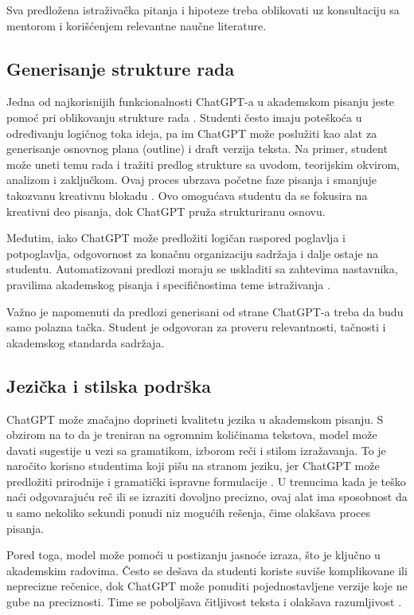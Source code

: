\documentclass[12pt]{article}
\begin{document}
Sva predložena istraživačka pitanja i hipoteze treba oblikovati uz konsultaciju sa mentorom i korišćenjem relevantne naučne literature. 

\subsection{Generisanje strukture rada}
Jedna od najkorisnijih funkcionalnosti ChatGPT-a u akademskom pisanju jeste pomoć pri oblikovanju strukture rada \cite{baig2024systematic}. Studenti često imaju poteškoća u određivanju logičnog toka ideja, pa im ChatGPT može poslužiti kao alat za generisanje osnovnog plana (outline) i draft verzija teksta. Na primer, student može uneti temu rada i tražiti predlog strukture sa uvodom, teorijskim okvirom, analizom i zaključkom. Ovaj proces ubrzava početne faze pisanja i smanjuje takozvanu kreativnu blokadu \cite{gradstudents2024revision}. Ovo omogućava studentu da se fokusira na kreativni deo pisanja, dok ChatGPT pruža strukturiranu osnovu.

Međutim, iako ChatGPT može predložiti logičan raspored poglavlja i potpoglavlja, odgovornost za konačnu organizaciju sadržaja i dalje ostaje na studentu. Automatizovani predlozi moraju se uskladiti sa zahtevima nastavnika, pravilima akademskog pisanja i specifičnostima teme istraživanja \cite{zakova2025exploring}. 

Važno je napomenuti da predlozi generisani od strane ChatGPT-a treba da budu samo polazna tačka. Student je odgovoran za proveru relevantnosti, tačnosti i akademskog standarda sadržaja.

\subsection{Jezička i stilska podrška}
ChatGPT može značajno doprineti kvalitetu jezika u akademskom pisanju. S obzirom na to da je treniran na ogromnim količinama tekstova, model može davati sugestije u vezi sa gramatikom, izborom reči i stilom izražavanja. To je naročito korisno studentima koji pišu na stranom jeziku, jer ChatGPT može predložiti prirodnije i gramatički ispravne formulacije \cite{alsaedi2024chatgpt}. U trenucima kada je teško naći odgovarajuću reč ili se izraziti dovoljno precizno, ovaj alat ima sposobnost da u samo nekoliko sekundi ponudi niz mogućih rešenja, čime olakšava proces pisanja.

Pored toga, model može pomoći u postizanju jasnoće izraza, što je ključno u akademskim radovima. Često se dešava da studenti koriste suviše komplikovane ili neprecizne rečenice, dok ChatGPT može ponuditi pojednostavljene verzije koje ne gube na preciznosti. Time se poboljšava čitljivost teksta i olakšava razumljivost \cite{zakova2025exploring}.
\end{document}
